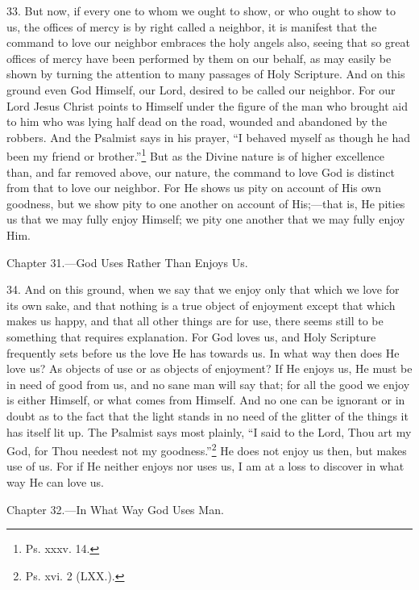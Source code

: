 33. But now, if every one to whom we ought to show, or who ought to show to us, the offices of mercy is by right called a neighbor, it is manifest that the command to love our neighbor embraces the holy angels also, seeing that so great offices of mercy have been performed by them on our behalf, as may easily be shown by turning the attention to many passages of Holy Scripture. And on this ground even God Himself, our Lord, desired to be called our neighbor. For our Lord Jesus Christ points to Himself under the figure of the man who brought aid to him who was lying half dead on the road, wounded and abandoned by the robbers. And the Psalmist says in his prayer, “I behaved myself as though he had been my friend or brother.”\footnote{Ps. xxxv. 14.} But as the Divine nature is of higher excellence than, and far removed above, our nature, the command to love God is distinct from that to love our neighbor. For He shows us pity on account of His own goodness, but we show pity to one another on account of His;—that is, He pities us that we may fully enjoy Himself; we pity one another that we may fully enjoy Him.


Chapter 31.—God Uses Rather Than Enjoys Us.

34. And on this ground, when we say that we enjoy only that which we love for its own sake, and that nothing is a true object of enjoyment except that which makes us happy, and that all other things are for use, there seems still to be something that requires explanation. For God loves us, and Holy Scripture frequently sets before us the love He has towards us. In what way then does He love us? As objects of use or as objects of enjoyment? If He enjoys us, He must be in need of good from us, and no sane man will say that; for all the good we enjoy is either Himself, or what comes from Himself. And no one can be ignorant or in doubt as to the fact that the light stands in no need of the glitter of the things it has itself lit up. The Psalmist says most plainly, “I said to the Lord, Thou art my God, for Thou needest not my goodness.”\footnote{Ps. xvi. 2 (LXX.).} He does not enjoy us then, but makes use of us. For if He neither enjoys nor uses us, I am at a loss to discover in what way He can love us.


Chapter 32.—In What Way God Uses Man.


